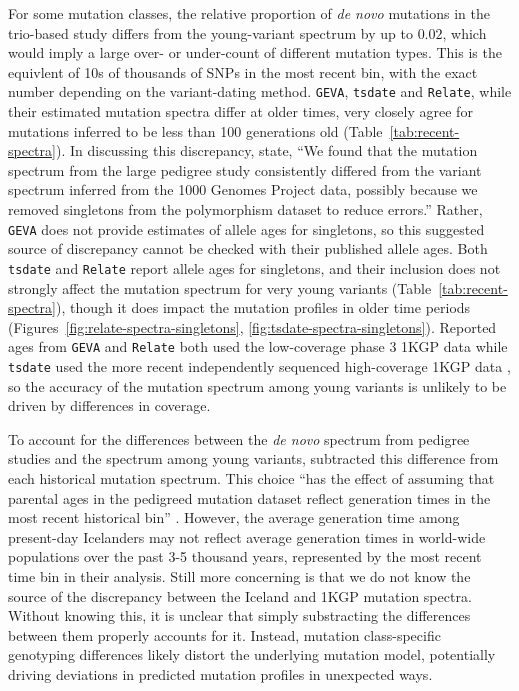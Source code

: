 \documentclass[]{article}
\newcommand{\krtcomment}[1]{{\textcolor{purple}{KRT: #1}}}
\newcommand{\GEVA}{\texttt{GEVA}\xspace}
\newcommand{\tsdate}{\texttt{tsdate}\xspace}
\newcommand{\relate}{\texttt{Relate}\xspace}
\begin{document}
For some mutation classes, the relative proportion of \emph{de novo} mutations
in the trio-based study differs from the young-variant spectrum by up to
$0.02$, which would imply a large over- or under-count of different mutation
types. This is the equivlent of 10s of thousands of SNPs in the most recent
bin, with the exact number depending on the variant-dating method.
\GEVA, \tsdate and \relate, while their estimated mutation spectra differ at
older times, very closely agree for mutations inferred to be less than 100
generations old (Table~\ref{tab:recent-spectra}). In discussing this
discrepancy, \citet{wang2023human} state, ``We found that the mutation spectrum
from the large pedigree study consistently differed from the variant spectrum
inferred from the 1000 Genomes Project data, possibly because we removed
singletons from the polymorphism dataset to reduce errors.'' Rather, \GEVA does
not provide estimates of allele ages for singletons, so this suggested source
of discrepancy cannot be checked with their published allele ages. Both \tsdate
and \relate report allele ages for singletons, and their inclusion does not
strongly affect the mutation spectrum for very young variants
(Table~\ref{tab:recent-spectra}), though it does impact the mutation profiles
in older time periods (Figures~\ref{fig:relate-spectra-singletons},
\ref{fig:tsdate-spectra-singletons}). Reported ages from \GEVA and \relate both
used the low-coverage phase 3 1KGP data while \tsdate used the more recent
independently sequenced high-coverage 1KGP data \citep{byrska2022high}, so the
accuracy of the mutation spectrum among young variants is unlikely to be driven
by differences in coverage.

To account for the differences between the \emph{de novo} spectrum from
pedigree studies \citep{jonsson2017parental} and the spectrum among young
variants, \citet{wang2023human} subtracted this difference from each historical
mutation spectrum. This choice ``has the effect of assuming that parental ages
in the pedigreed mutation dataset reflect generation times in the most recent
historical bin'' \citep{wang2023human}. However, the average generation time
among present-day Icelanders may not reflect average generation times in
world-wide populations over the past 3-5 thousand years, represented by the
most recent time bin in their analysis. Still more concerning is that we do not
know the source of the discrepancy between the Iceland and 1KGP mutation
spectra. Without knowing this, it is unclear that simply substracting the
differences between them properly accounts for it. Instead, mutation
class-specific genotyping differences likely distort the underlying mutation
model, potentially driving deviations in predicted mutation profiles in
unexpected ways.
\end{document}
